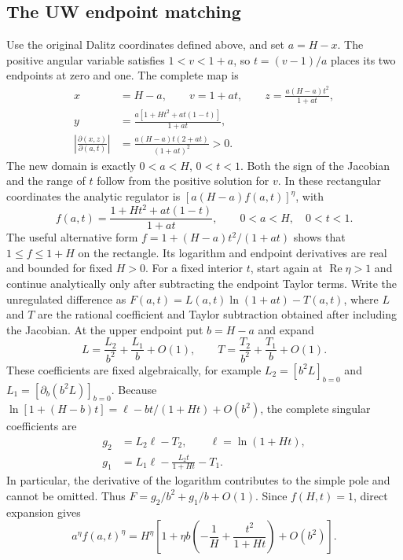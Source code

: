\subsection{The UW endpoint matching}
Use the original Dalitz coordinates defined above, and set
$a=H-x$. The positive angular variable satisfies $1<v<1+a$, so
$t=(v-1)/a$ places its two endpoints at zero and one. The complete map is
\begin{align}
 x&=H-a,\qquad v=1+at,\qquad
 z=\frac{a(H-a)t^2}{1+at},\\
 y&=\frac{a[1+Ht^2+at(1-t)]}{1+at},\\
 \left|\frac{\partial(x,z)}{\partial(a,t)}\right|
 &=\frac{a(H-a)t(2+at)}{(1+at)^2}>0.
\end{align}
The new domain is exactly $0<a<H$, $0<t<1$. Both the sign of the
Jacobian and the range of $t$ follow from the positive solution for $v$.
In these rectangular coordinates the analytic
regulator is $[a(H-a)f(a,t)]^\eta$, with
\begin{equation}
 f(a,t)=\frac{1+Ht^2+at(1-t)}{1+at},\qquad
 0<a<H,\quad 0<t<1.
\end{equation}
The useful alternative form $f=1+(H-a)t^2/(1+at)$ shows that
$1\leq f\leq1+H$ on the rectangle. Its logarithm and endpoint derivatives
are real and bounded for fixed $H>0$. For a fixed interior $t$, start
again at $\operatorname{Re}\eta>1$ and continue analytically only after
subtracting the endpoint Taylor terms.
Write the unregulated difference as
$F(a,t)=L(a,t)\ln(1+at)-T(a,t)$, where $L$ and $T$ are the rational
coefficient and Taylor subtraction obtained after including the Jacobian.
At the upper endpoint put $b=H-a$ and expand
\begin{equation}
 L=\frac{L_2}{b^2}+\frac{L_1}{b}+O(1),\qquad
 T=\frac{T_2}{b^2}+\frac{T_1}{b}+O(1).
\end{equation}
These coefficients are fixed algebraically, for example
$L_2=[b^2L]_{b=0}$ and $L_1=[\partial_b(b^2L)]_{b=0}$.
Because $\ln[1+(H-b)t]=\ell-bt/(1+Ht)+O(b^2)$, the complete singular
coefficients are
\begin{align}
 g_2&=L_2\ell-T_2,\qquad \ell=\ln(1+Ht),\\
 g_1&=L_1\ell-\frac{L_2t}{1+Ht}-T_1.
\end{align}
In particular, the derivative of the logarithm contributes to the simple
pole and cannot be omitted. Thus $F=g_2/b^2+g_1/b+O(1)$.
Since $f(H,t)=1$, direct expansion gives
\begin{equation}
 a^\eta f(a,t)^\eta
 =H^\eta\left[1+\eta b\left(-\frac1H+\frac{t^2}{1+Ht}\right)
 +O(b^2)\right].
\end{equation}
